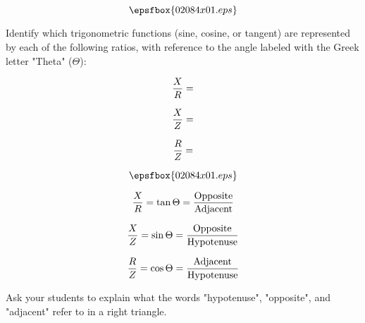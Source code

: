 

$$\epsfbox{02084x01.eps}$$

Identify which trigonometric functions (sine, cosine, or tangent) are represented by each of the following ratios, with reference to the angle labeled with the Greek letter "Theta" ($\Theta$):

$${X \over R} = $$

$${X \over Z} = $$

$${R \over Z} = $$







$$\epsfbox{02084x01.eps}$$

$${X \over R} = \tan \Theta = {\hbox{Opposite} \over \hbox{Adjacent}}$$

$${X \over Z} = \sin \Theta = {\hbox{Opposite} \over \hbox{Hypotenuse}}$$

$${R \over Z} = \cos \Theta = {\hbox{Adjacent} \over \hbox{Hypotenuse}}$$







Ask your students to explain what the words "hypotenuse", "opposite", and "adjacent" refer to in a right triangle.




